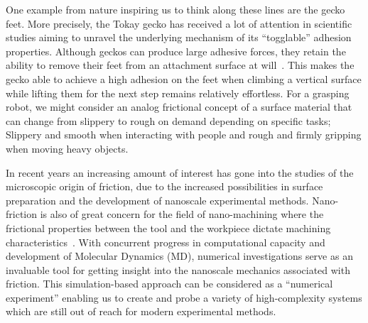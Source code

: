 One example from nature inspiring us to think along these lines are the gecko
feet. More precisely, the Tokay gecko has received a lot of attention in
scientific studies aiming to unravel the underlying mechanism of its
``togglable'' adhesion properties. Although geckos can produce large adhesive
forces, they retain the ability to remove their feet from an attachment surface
at will~\cite{Gekko}. This makes the gecko able to achieve a high adhesion on
the feet when climbing a vertical surface while lifting them for the next step
remains relatively effortless. For a grasping robot, we might consider an analog
frictional concept of a surface material that can change from slippery to rough
on demand depending on specific tasks; Slippery and smooth when interacting with
people and rough and firmly gripping when moving heavy objects.


In recent years an increasing amount of interest has gone into the studies of
the microscopic origin of friction, due to the increased possibilities in
surface preparation and the development of nanoscale experimental methods.
Nano-friction is also of great concern for the field of nano-machining where the
frictional properties between the tool and the workpiece dictate machining
characteristics~\cite{kim_nano-scale_2009}. With concurrent progress in
computational capacity and development of Molecular Dynamics (\acrshort{MD}),
numerical investigations serve as an invaluable tool for getting insight into
the nanoscale mechanics associated with friction. This simulation-based approach
can be considered as a ``numerical experiment'' enabling us to create and probe
a variety of high-complexity systems which are still out of reach for modern
experimental methods.

